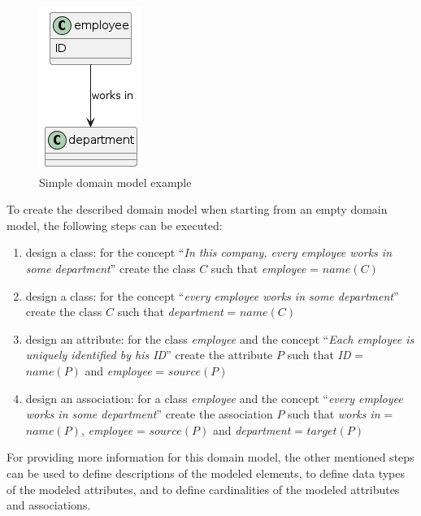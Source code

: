 \begin{figure}[!h]
    \centering
    \includegraphics[scale=0.65]{img/domain-modeling-steps-example.png}
    \caption{\centering Simple domain model example}
    \label{fig:simple-employee-domain-model}
\end{figure}

To create the described domain model when starting from an empty domain model, the following steps can be executed:

\begin{enumerate}
\item design a class: for the concept ``\textit{In this company, every employee works in some department}'' create the class $C$ such that \textit{employee} = $name(C)$
\item design a class: for the concept ``\textit{every employee works in some department}'' create the class $C$ such that \textit{department} = $name(C)$
\item design an attribute: for the class \textit{employee} and the concept ``\textit{Each employee is uniquely identified by his ID}'' create the attribute $P$ such that \textit{ID} = $name(P)$ and \textit{employee} = $source(P)$
\item design an association: for a class \textit{employee} and the concept ``\textit{every employee works in some department}'' create the association $P$ such that \textit{works in} = $name(P)$, \textit{employee} = $source(P)$ and \textit{department} = $target(P)$
\end{enumerate}

For providing more information for this domain model, the other mentioned steps can be used to define descriptions of the modeled elements, to define data types of the modeled attributes, and to define cardinalities of the modeled attributes and associations.
